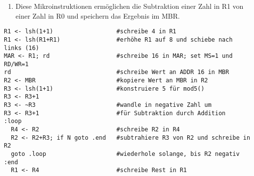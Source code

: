 \documentclass[a4paper, 12pt, margins=2cm]{homework}
\begin{document}
\begin{solution}
\begin{enumerate}[label=(\alph*)]
    \item \hfill 

    Diese Mikroinstruktionen ermöglichen die Subtraktion einer Zahl in R1 von einer
    Zahl in R0 und speichern das Ergebnis im MBR.
    \end{enumerate}

  \end{solution}


  \begin{problem}
  \end{problem}
  \begin{solution} \hfill

    \begin{lstlisting}
R1 <- lsh(1+1)                  #schreibe 4 in R1
R1 <- lsh(R1+R1)                #erhöhe R1 auf 8 und schiebe nach links (16)
MAR <- R1; rd                   #schreibe 16 in MAR; set MS=1 und RD/WR=1
rd                              #schreibe Wert an ADDR 16 in MBR
R2 <- MBR                       #kopiere Wert an MBR in R2
R3 <- lsh(1+1)                  #konstruiere 5 für mod5()
R3 <- R3+1
R3 <- ~R3                       #wandle in negative Zahl um
R3 <- R3+1                      #für Subtraktion durch Addition
:loop
  R4 <- R2                      #schreibe R2 in R4
  R2 <- R2+R3; if N goto .end   #subtrahiere R3 von R2 und schreibe in R2
  goto .loop                    #wiederhole solange, bis R2 negativ
:end
  R1 <- R4                      #schreibe Rest in R1\end{lstlisting}
  \end{solution}

\newpage
 
\end{document}

